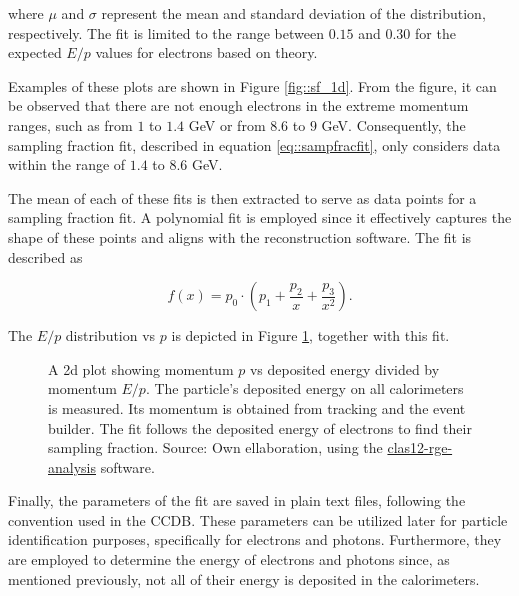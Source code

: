     where $\mu$ and $\sigma$ represent the mean and standard deviation of the distribution, respectively. The fit is limited to the range between $0.15$ and $0.30$ for the expected $E/p$ values for electrons based on theory.

    Examples of these plots are shown in Figure \ref{fig::sf_1d}.
    From the figure, it can be observed that there are not enough electrons in the extreme momentum ranges, such as from $1$ to $1.4$ GeV or from $8.6$ to $9$ GeV.
    Consequently, the sampling fraction fit, described in equation \eqref{eq::sampfracfit}, only considers data within the range of $1.4$ to $8.6$ GeV.

    The mean of each of these fits is then extracted to serve as data points for a sampling fraction fit.
    A polynomial fit is employed since it effectively captures the shape of these points and aligns with the reconstruction software.
    The fit is described as

    \begin{equation} \label{eq::sampfracfit}
        f(x) = p_0 \cdot \left(p_1 + \frac{p_2}{x} + \frac{p_3}{x^2}\right).
    \end{equation}

    The $E/p$ distribution vs $p$ is depicted in Figure \ref{fig::sf_2d}, together with this fit.

    \begin{figure}[t!]
        \centering{}
        \caption[Calorimeters $p vs E/p$ plots]{A 2d plot showing momentum $p$ vs deposited energy divided by momentum $E/p$.
        The particle's deposited energy on all calorimeters is measured.
        Its momentum is obtained from tracking and the event builder.
        The fit follows the deposited energy of electrons to find their sampling fraction.
        Source: Own ellaboration, using the \hyperlink{github.com/bleaktwig/clas12-rge-analysis}{clas12-rge-analysis} software.}
        \label{fig::sf_2d}
    \end{figure}

    Finally, the parameters of the fit are saved in plain text files, following the convention used in the CCDB.
    These parameters can be utilized later for particle identification purposes, specifically for electrons and photons.
    Furthermore, they are employed to determine the energy of electrons and photons since, as mentioned previously, not all of their energy is deposited in the calorimeters.

